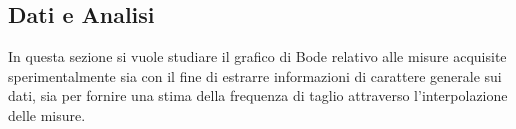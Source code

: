 \documentclass[a4paper,11pt]{article} %
\begin{document}

\subsection{Dati e Analisi}
In questa sezione si vuole studiare il grafico di Bode relativo alle misure acquisite sperimentalmente sia con il fine di estrarre
informazioni di carattere generale sui dati, sia per fornire una stima della frequenza di taglio attraverso
l'interpolazione delle misure.


\end{document}
